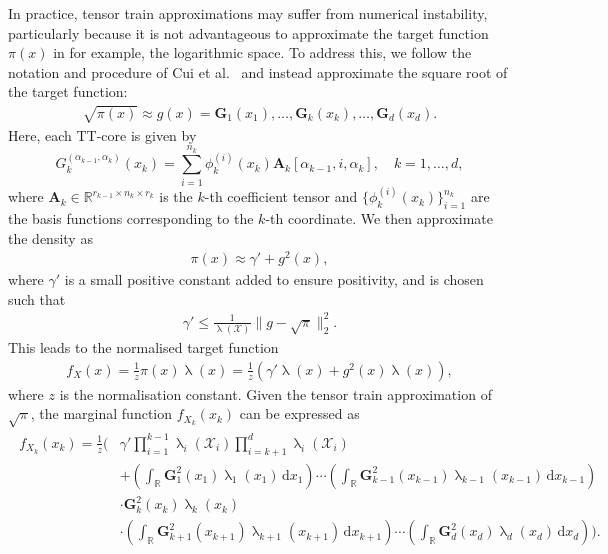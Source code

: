 In practice, tensor train approximations may suffer from numerical instability, particularly because it is not advantageous to approximate the target function $\pi(x)$ in for example, the logarithmic space. 
To address this, we follow the notation and procedure of Cui et al.~\cite{cui2022deep} and instead approximate the square root of the target function:
\begin{align}
	\sqrt{\pi(x)} \approx g(x) = \bm{G}_1(x_1), \dots, \bm{G}_k(x_k), \dots, \bm{G}_d(x_d).
\end{align}
Here, each TT-core is given by
\begin{equation}
	G^{(\alpha_{k-1},\alpha_k)}_k(x_k) = \sum_{i=1}^{n_k} \phi^{(i)}_k(x_k) \bm{A}_k[\alpha_{k-1}, i, \alpha_k], \quad k = 1, \dots, d,
\end{equation}
where $\bm{A}_k \in \mathbb{R}^{r_{k-1} \times n_k \times r_k}$ is the $k$-th coefficient tensor and $\{\phi^{(i)}_k(x_k)\}_{i=1}^{n_k}$ are the basis functions corresponding to the $k$-th coordinate.
We then approximate the density as
\begin{align}
	\pi(x) \approx \gamma' + g^2(x),
\end{align}
where $\gamma'$ is a small positive constant added to ensure positivity, and is chosen such that
\begin{align}
	\gamma' \leq \frac{1}{\uplambda(\mathcal{X})} \lVert g - \sqrt{\pi} \rVert_2^2.
\end{align}
This leads to the normalised target function
\begin{align}
	f_X(x) = \frac{1}{z} \pi(x) \uplambda(x) = \frac{1}{z} \left( \gamma' \uplambda(x) + g^2(x) \uplambda(x) \right),
\end{align}
where $z$ is the normalisation constant.
Given the tensor train approximation of $\sqrt{\pi}$, the marginal function $f_{X_k}(x_k)$ can be expressed as
\begin{align}
	\begin{split}
		f_{X_k}(x_k) = \frac{1}{z} \Bigg(&\gamma' \prod_{i=1}^{k-1} \uplambda_i(\mathcal{X}_i) \prod_{i=k+1}^{d} \uplambda_i(\mathcal{X}_i) \\
		&+ \left( \int_{\mathbb{R}} \bm{G}_1^2(x_1) \uplambda_1(x_1) \, \mathrm{d}x_1 \right) \cdots 
		\left( \int_{\mathbb{R}} \bm{G}_{k-1}^2(x_{k-1}) \uplambda_{k-1}(x_{k-1}) \, \mathrm{d}x_{k-1} \right) \\
		&\cdot \bm{G}_k^2(x_k) \uplambda_k(x_k) \\
		&\cdot \left( \int_{\mathbb{R}} \bm{G}_{k+1}^2(x_{k+1}) \uplambda_{k+1}(x_{k+1}) \, \mathrm{d}x_{k+1} \right) \cdots 
		\left( \int_{\mathbb{R}} \bm{G}_d^2(x_d) \uplambda_d(x_d) \, \mathrm{d}x_d \right) \Bigg).
	\end{split}
\end{align}
